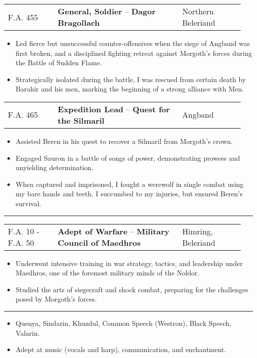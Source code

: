 \documentclass[a4paper, 10pt]{article}
\makeatletter
\newcommand{\sectiontitle}[1]{
    \vspace{8pt}
    \footnotesize
    \noindent{\large \textbf{#1}}
    \vspace{3pt}
    \hrule
    \vspace{6pt}
}
\newcommand{\entry}[4]{
    \vspace{6pt}
    \footnotesize
    \noindent
    \begin{tabular}{@{} p{0.2\linewidth} p{0.5\linewidth} p{0.25\linewidth} @{}}
        {#4} & \textbf{#1} -- \textbf{#2} & \hfill{#3} \\
    \end{tabular}
    \vspace{4pt}
}
\makeatother
\begin{document}
\entry{General, Soldier}{Dagor Bragollach}{Northern Beleriand}{F.A. 455}
\begin{itemize}[left=0.25\linewidth, noitemsep, before=\small]
    \footnotesize
    \item Led fierce but unsuccessful counter-offensives when the siege of Angband was first broken, and a disciplined fighting retreat against Morgoth's forces during the Battle of Sudden Flame.
    \item Strategically isolated during the battle, I was rescued from certain death by Barahir and his men, marking the beginning of a strong alliance with Men.
\end{itemize}

\entry{Expedition Lead}{Quest for the Silmaril}{Angband}{F.A. 465}
\begin{itemize}[left=0.25\linewidth, noitemsep, before=\small]
    \footnotesize
    \item Assisted Beren in his quest to recover a Silmaril from Morgoth's crown.
    \item Engaged Sauron in a battle of songs of power, demonstrating prowess and unyielding determination.
    \item When captured and imprisoned, I fought a werewolf in single combat using my bare hands and teeth. I succumbed to my injuries, but ensured Beren's survival.
\end{itemize}


\sectiontitle{Education}

\entry{Adept of Warfare}{Military Council of Maedhros}{Himring, Beleriand}{F.A. 10 - F.A. 50}
\begin{itemize}[left=0.25\linewidth, noitemsep, before=\small]
    \footnotesize
    \item Underwent intensive training in war strategy, tactics, and leadership under Maedhros, one of the foremost military minds of the Noldor.
    \item Studied the arts of siegecraft and shock combat, preparing for the challenges posed by Morgoth's forces.
\end{itemize}

\sectiontitle{Interests}
\begin{itemize}[left=0.25\linewidth, noitemsep]
    \footnotesize
    \item Quenya, Sindarin, Khuzdul, Common Speech (Westron), Black Speech, Valarin.
    \item Adept at music (vocals and harp), communication, and enchantment.
\end{itemize}
\end{document}
